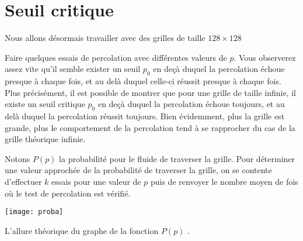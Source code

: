 %
\section*{Seuil critique}\label{seuil-critique}
%
Nous allons désormais travailler avec des grilles de taille $128\times 128$ 



Faire quelques essais de percolation avec différentes valeurs de $p$. Vous observerez assez vite qu'il semble exister un seuil $p_0$ en deçà duquel la percolation
échoue presque à chaque fois, et au delà duquel celle-ci réussit presque
à chaque fois. Plus précisément, il est possible de montrer que pour une
grille de taille infinie, il existe un seuil critique
$p_0$ en deçà duquel la percolation échoue toujours,
et au delà duquel la percolation réussit toujours. Bien évidemment, plus
la grille est grande, plus le comportement de la percolation tend à se
rapprocher du cas de la grille théorique infinie.


Notons $P(p)$ la probabilité pour le fluide de traverser la grille. Pour déterminer une valeur approchée de la probabilité de traverser la grille, on se contente d'effectuer $k$ essais pour une valeur de $p$ puis de renvoyer le nombre moyen de fois où le test de percolation est vérifié.\\

\begin{marginfigure}
\texttt{[image: proba]}
\caption{L'allure théorique du graphe de la fonction $P(p)$ \label{fig3}.}
\end{marginfigure}






